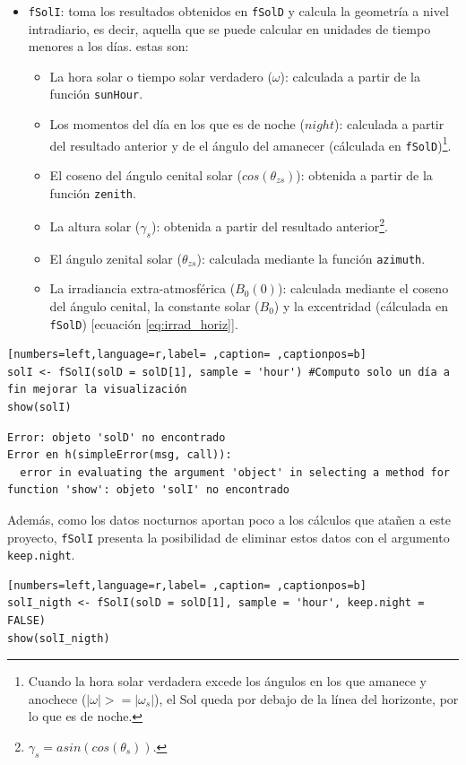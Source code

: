 \begin{itemize}
\item \texttt{fSolI}: toma los resultados obtenidos en \texttt{fSolD} y calcula la geometría a nivel intradiario, es decir, aquella que se puede calcular en unidades de tiempo menores a los días.
estas son:
\begin{itemize}
\item La hora solar o tiempo solar verdadero (\(\omega\)): calculada a partir de la función \texttt{sunHour}.
\item Los momentos del día en los que es de noche (\(night\)): calculada a partir del resultado anterior y de el ángulo del amanecer (cálculada en \texttt{fSolD})\footnote{Cuando la hora solar verdadera excede los ángulos en los que amanece y anochece (\(|\omega|>=|\omega_s|\)), el Sol queda por debajo de la línea del horizonte, por lo que es de noche.}.
\item El coseno del ángulo cenital solar (\(cos(\theta_{zs})\)): obtenida a partir de la función \texttt{zenith}.
\item La altura solar (\(\gamma_s\)): obtenida a partir del resultado anterior\footnote{\(\gamma_s=asin(cos(\theta_s))\).}.
\item El ángulo zenital solar (\(\theta_{zs}\)): calculada mediante la función \texttt{azimuth}.
\item La irradiancia extra-atmosférica (\(B_0(0)\)): calculada mediante el coseno del ángulo cenital, la constante solar (\(B_0\)) y la excentridad (cálculada en \texttt{fSolD}) [ecuación \ref{eq:irrad_horiz}].
\end{itemize}
\end{itemize}
\begin{lstlisting}[numbers=left,language=r,label= ,caption= ,captionpos=b]
solI <- fSolI(solD = solD[1], sample = 'hour') #Computo solo un día a fin mejorar la visualización
show(solI)
\end{lstlisting}

\begin{verbatim}
Error: objeto 'solD' no encontrado
Error en h(simpleError(msg, call)): 
  error in evaluating the argument 'object' in selecting a method for function 'show': objeto 'solI' no encontrado
\end{verbatim}


Además, como los datos nocturnos aportan poco a los cálculos que atañen a este proyecto, \texttt{fSolI} presenta la posibilidad de eliminar estos datos con el argumento \texttt{keep.night}.
\begin{lstlisting}[numbers=left,language=r,label= ,caption= ,captionpos=b]
solI_nigth <- fSolI(solD = solD[1], sample = 'hour', keep.night = FALSE)
show(solI_nigth)
\end{lstlisting}

